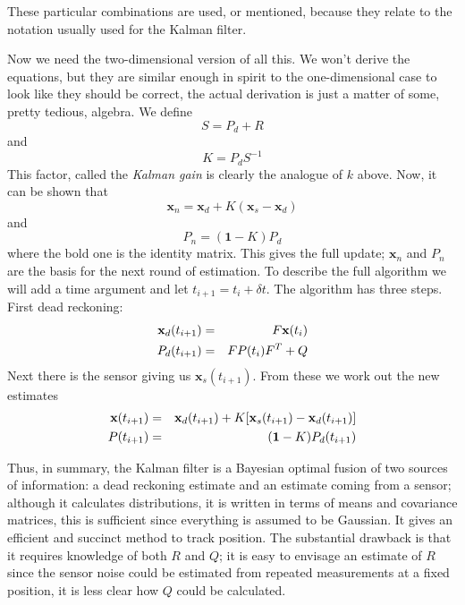 \documentclass[12pt]{article}
\begin{document}
These particular combinations are used, or mentioned, because they relate to the
notation usually used for the Kalman filter.


Now we need the two-dimensional version of all this. We won't derive
the equations, but they are similar enough in spirit to the
one-dimensional case to look like they should be correct, the actual
derivation is just a matter of some, pretty tedious, algebra. We define
\begin{equation}
S=P_d+R
\end{equation}
and
\begin{equation}
K=P_dS^{-1}
\end{equation}
This factor, called the \textsl{Kalman gain} is clearly the analogue of $k$ above. Now, it can be shown that
\begin{equation}
\mathbf{x}_n=\mathbf{x}_d+K(\mathbf{x}_s-\mathbf{x}_d)
\end{equation}
and 
\begin{equation}
P_n=(\textbf{1}-K)P_d
\end{equation}
where the bold one is the identity matrix. This gives the full update;
$\mathbf{x}_n$ and $P_n$ are the basis for the next round of
estimation. To describe the full algorithm we will add a time argument
and let $t_{i+1}=t_i+\delta t$. The algorithm has three steps. First
dead reckoning:
\begin{eqnarray}
\textbf{x}_d(t_{i+1})&=&F\textbf{x}(t_i)\cr
P_d(t_{i+1})&=&FP(t_i)F^{T}+Q
\end{eqnarray}
Next there is the sensor giving us $\mathbf{x}_s(t_{i+1})$. From these we work out the new estimates
\begin{eqnarray}
\textbf{x}(t_{i+1})&=&\mathbf{x}_d(t_{i+1})+K[\mathbf{x}_s(t_{i+1})-\mathbf{x}_d(t_{i+1})]\cr
P(t_{i+1})&=&(\textbf{1}-K)P_d(t_{i+1})
\end{eqnarray}

Thus, in summary, the Kalman filter is a Bayesian optimal fusion of
two sources of information: a dead reckoning estimate and an estimate
coming from a sensor; although it calculates distributions, it is
written in terms of means and covariance matrices, this is sufficient
since everything is assumed to be Gaussian. It gives an efficient and
succinct method to track position. The substantial drawback is that it
requires knowledge of both $R$ and $Q$; it is easy to envisage an
estimate of $R$ since the sensor noise could be estimated from
repeated measurements at a fixed position, it is less clear how $Q$
could be calculated.


{}
\end{document}
